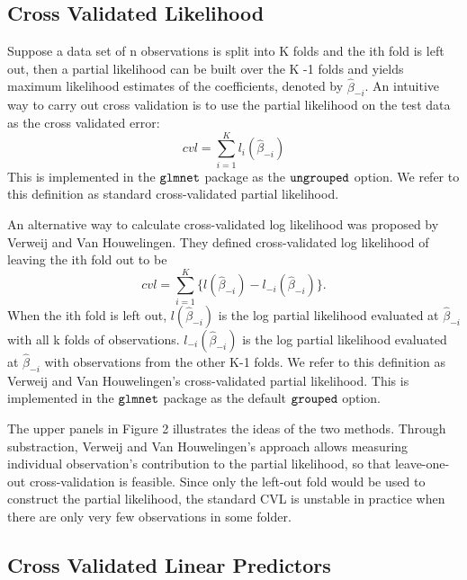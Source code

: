 \subsection{Cross Validated Likelihood} 
\label{Sec:cox-cv-existing}

Suppose a data set of n observations is split into K folds and the ith fold is left out, then a partial likelihood can be built over the K -1 folds and yields maximum likelihood estimates of the coefficients, denoted by $\hat{\beta}_{-i}$. An intuitive way to carry out cross validation is to use the partial likelihood on the test data as the cross validated error: \begin{equation}cvl = \sum_{i=1}^{K} l_{i}(\hat{\beta}_{-i})\end{equation} This is implemented in the $\tt{glmnet}$ package as the $\tt{ungrouped}$ option. We refer to this definition as standard cross-validated partial likelihood.

An alternative way to calculate cross-validated log likelihood was proposed by Verweij and Van Houwelingen. They defined cross-validated log likelihood of leaving the ith fold out to be \begin{equation}cvl = \sum_{i=1}^{K} \{l(\hat{\beta}_{-i}) - l_{-i}(\hat{\beta}_{-i})\}. \end{equation} When the ith fold is left out, $l(\hat{\beta}_{-i})$ is the log partial likelihood evaluated at $\hat{\beta}_{-i}$ with all k folds of observations. $l_{-i}(\hat{\beta}_{-i})$ is the log partial likelihood evaluated at $\hat{\beta}_{-i}$ with observations from the other K-1 folds. We refer to this definition as Verweij and Van Houwelingen's cross-validated partial likelihood. This is implemented in the $\tt{glmnet}$ package as the default $\tt{grouped}$ option.

\par The upper panels in Figure 2 illustrates the ideas of the two methods. Through substraction, Verweij and Van Houwelingen's approach allows measuring individual observation's contribution to the partial likelihood, so that leave-one-out cross-validation is feasible. Since only the left-out fold would be used to construct the partial likelihood, the standard CVL is unstable in practice when there are only very few observations in some folder. 

  \subsection{Cross Validated Linear Predictors}

